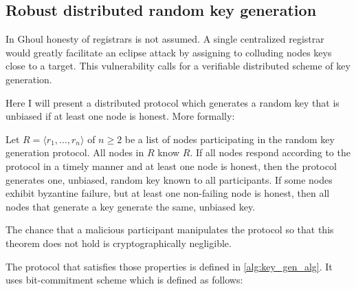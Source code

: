 \subsection{Robust distributed random key generation}

In Ghoul honesty of registrars is not assumed. A single centralized
registrar would greatly facilitate an eclipse attack by assigning to colluding
nodes keys close to a target. This vulnerability  calls for a verifiable
distributed scheme of key generation.

Here I will present a distributed protocol which generates a random key that is
unbiased if at least one node is honest. More formally:

\begin{theorem}
  Let $R = \langle r_1, \ldots, r_n \rangle$ of $n \geq 2$ be a list of nodes
  participating in the random key generation protocol. All nodes in $R$ know
  $R$. 
  If all nodes respond according to the protocol in a timely manner and at least
  one node is honest, then the protocol generates one, unbiased, random key known
  to all participants.
  If some nodes exhibit byzantine failure, but at least one non-failing node is
  honest, then all nodes that generate a key generate the same, unbiased key.

  The chance that a malicious participant manipulates the protocol so that this
  theorem does not hold is cryptographically negligible.
  \label{th:robust_distributed_key_generation}
\end{theorem}

The protocol that satisfies those properties is defined in
\ref{alg:key_gen_alg}.  It uses bit-commitment scheme which is defined as
follows:

